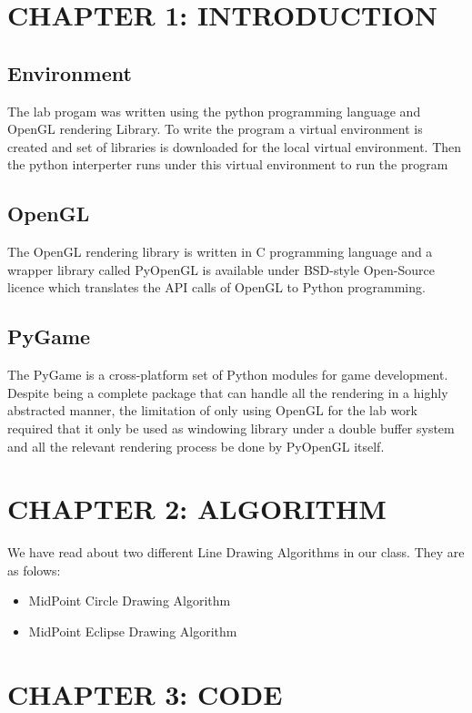 \documentclass[12pt]{article}
\begin{document}
\clearpage
\thispagestyle{empty}
\tableofcontents

\clearpage
\thispagestyle{empty}
\listoffigures

\clearpage
{}
\section{CHAPTER 1: INTRODUCTION}

\subsection{Environment}
The lab progam was written using the python programming language and OpenGL rendering Library. To write the program a virtual environment is
created and set of libraries is downloaded for the local virtual environment. Then the python interperter runs under this virtual environment
to run the program

\subsection{OpenGL}
The OpenGL rendering library is written in C programming language and a wrapper library called PyOpenGL is available under BSD-style Open-Source licence which translates the
API calls of OpenGL to Python programming.

\subsection{PyGame}
The PyGame is a cross-platform set of Python modules for game development. Despite being a complete package that can handle all the rendering in a highly abstracted manner, the
limitation of only using OpenGL for the lab work required that it only be used as windowing library under a double buffer system and all the relevant rendering process be done by PyOpenGL itself.

\section{CHAPTER 2: ALGORITHM}
We have read about two different Line Drawing Algorithms in our class. They are as folows:
\begin{itemize}
    \item MidPoint Circle Drawing Algorithm
    \item MidPoint Eclipse Drawing Algorithm
\end{itemize}
\clearpage
\section{CHAPTER 3: CODE}
\end{document}
